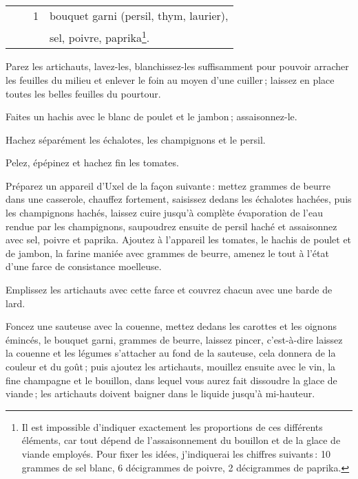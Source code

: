 \begin{longtable}{rrrp{18em}}
        &         &  1 & bouquet garni (persil, thym, laurier),                                           \\
        &         &    & sel, poivre, paprika\footnote{Il est impossible d'indiquer exactement
                                      les proportions de ces différents éléments, car
                                      tout dépend de l'assaisonnement du bouillon et de
                                      la glace de viande employés. Pour fixer les idées,
                                      j'indiquerai les chiffres suivants : 10 grammes de
                                      sel blanc, 6 décigrammes de poivre,
                                      2 décigrammes de paprika.}.                                         \\
\end{longtable}
\normalsize

Parez les artichauts, lavez-les, blanchissez-les suffisamment pour pouvoir
arracher les feuilles du milieu et enlever le foin au moyen d'une cuiller ;
laissez en place toutes les belles feuilles du pourtour.

Faites un hachis avec le blanc de poulet et le jambon ; assaisonnez-le.

Hachez séparément les échalotes, les champignons et le persil.

Pelez, épépinez et hachez fin les tomates.

Préparez un appareil d'Uxel de la façon suivante : mettez {\mmm} grammes
de beurre dans une casserole, chauffez fortement, saisissez dedans les
échalotes hachées, puis les champignons hachés, laissez cuire jusqu'à complète
évaporation de l'eau rendue par les champignons, saupoudrez ensuite de persil
haché et assaisonnez avec sel, poivre et paprika. Ajoutez à l'appareil les
tomates, le hachis de poulet et de jambon, la farine maniée avec {\mmm}
grammes de beurre, amenez le tout à l'état d'une farce de consistance
moelleuse.

Emplissez les artichauts avec cette farce et couvrez chacun avec une barde de
lard.

Foncez une sauteuse avec la couenne, mettez dedans les carottes et les oignons
émincés, le bouquet garni, {\mmm} grammes de beurre, laissez pincer,
c'est-à-dire laissez la couenne et les légumes s'attacher au fond de la
sauteuse, cela donnera de la couleur et du goût ; puis ajoutez les artichauts,
mouillez ensuite avec le vin, la fine champagne et le bouillon, dans lequel
vous aurez fait dissoudre la glace de viande ; les artichauts doivent baigner
dans le liquide jusqu'à mi-hauteur.

